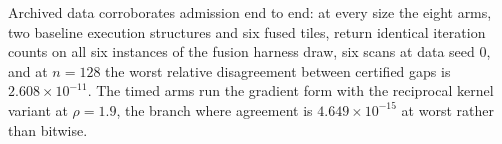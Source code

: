 Archived data corroborates admission end to end: at every size the eight arms,
two baseline execution structures and six fused tiles, return identical
iteration counts on all six instances of the fusion harness draw, six scans at
data seed 0, and at $n=128$ the worst relative disagreement between certified
gaps is $2.608\times10^{-11}$. The timed arms run the gradient form with the
reciprocal kernel variant at $\rho=1.9$, the branch where agreement is
$4.649\times10^{-15}$ at worst rather than bitwise.
